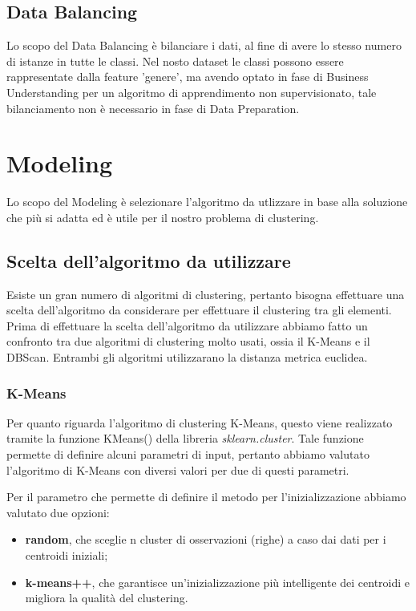 \documentclass[a4paper, 10pt]{report}
\begin{document}
        \section{Data Balancing}\label{sec:data-balancing}
            Lo scopo del Data Balancing è bilanciare i dati, al fine di avere lo stesso numero di istanze in tutte le classi.
            Nel nosto dataset le classi possono essere rappresentate dalla feature 'genere', ma avendo optato in fase di
            Business Understanding per un algoritmo di apprendimento non supervisionato, tale bilanciamento non è necessario
            in fase di Data Preparation.


    \chapter{Modeling}\label{ch:modeling}

        Lo scopo del Modeling è selezionare l'algoritmo da utlizzare in base alla soluzione che più si adatta ed è utile per
        il nostro problema di clustering.

        \section{Scelta dell'algoritmo da utilizzare}\label{sec:scelta-dell'algoritmo-da-utilizzare}
            Esiste un gran numero di algoritmi di clustering, pertanto bisogna effettuare una scelta dell'algoritmo da considerare
            per effettuare il clustering tra gli elementi.
            Prima di effettuare la scelta dell'algoritmo da utilizzare abbiamo fatto un confronto tra due algoritmi di clustering molto
            usati, ossia il K-Means e il DBScan.
            Entrambi gli algoritmi utilizzarano la distanza metrica euclidea.

            \subsection{K-Means}
                Per quanto riguarda l'algoritmo di clustering K-Means, questo viene realizzato tramite la funzione KMeans()
                della libreria \textit{sklearn.cluster}.
                Tale funzione permette di definire alcuni parametri di input, pertanto abbiamo valutato l'algoritmo di K-Means
                con diversi valori per due di questi parametri.

                Per il parametro che permette di definire il metodo per l'inizializzazione abbiamo valutato due opzioni:
                    \begin{itemize}
                        \item \textbf{random}, che sceglie n cluster di osservazioni (righe) a caso dai dati per i centroidi iniziali;
                        \item \textbf{k-means++}, che garantisce un'inizializzazione più intelligente dei centroidi e migliora la qualità del clustering.
                    \end{itemize}
\end{document}
